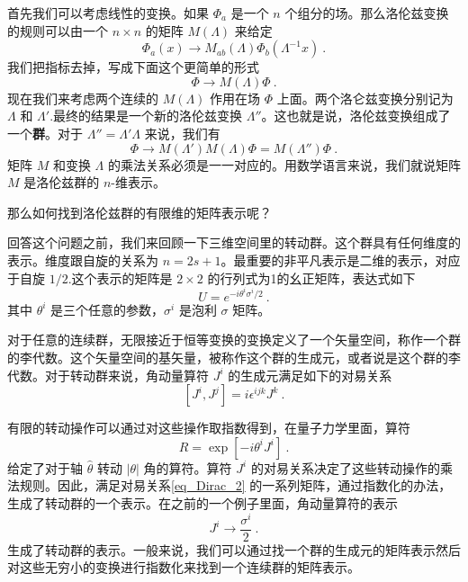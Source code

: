 首先我们可以考虑线性的变换。如果 $\Phi_a$ 是一个 $n$ 个组分的场。那么洛伦兹变换的规则可以由一个 $n\times n$ 的矩阵 $M(\Lambda)$ 来给定
\begin{equation}
\Phi_a (x) \rightarrow M_{ab} (\Lambda) \Phi_b(\Lambda^{-1} x)~.
\end{equation}
我们把指标去掉，写成下面这个更简单的形式
\begin{equation}
\Phi\rightarrow M(\Lambda)\Phi~.
\end{equation}
现在我们来考虑两个连续的 $M(\Lambda)$ 作用在场 $\Phi$ 上面。两个洛仑兹变换分别记为 $\Lambda$ 和 $\Lambda'$.最终的结果是一个新的洛伦兹变换 $\Lambda''$。这也就是说，洛伦兹变换组成了一个\textbf{群}。对于 $\Lambda''=\Lambda'\Lambda$ 来说，我们有
\begin{equation}
\Phi\rightarrow M(\Lambda')M(\Lambda)\Phi = M(\Lambda'')\Phi~.
\end{equation}
矩阵 $M$ 和变换 $\Lambda$ 的乘法关系必须是一一对应的。用数学语言来说，我们就说矩阵 $M$ 是洛伦兹群的 $n$-维表示。

那么如何找到洛伦兹群的有限维的矩阵表示呢？

回答这个问题之前，我们来回顾一下三维空间里的转动群。这个群具有任何维度的表示。维度跟自旋的关系为 $n=2s+1$。最重要的非平凡表示是二维的表示，对应于自旋 $1/2$.这个表示的矩阵是 $2\times 2$ 的行列式为1的幺正矩阵，表达式如下
\begin{equation}
U = e^{-i\theta^i\sigma^i/2}~.
\end{equation} 
其中 $\theta^i$ 是三个任意的参数，$\sigma^i$ 是泡利 $\sigma$ 矩阵。

对于任意的连续群，无限接近于恒等变换的变换定义了一个矢量空间，称作一个群的李代数。这个矢量空间的基矢量，被称作这个群的生成元，或者说是这个群的李代数。对于转动群来说，角动量算符 $J^i$ 的生成元满足如下的对易关系
\begin{equation}\label{eq_Dirac_2}
[J^i,J^j] = i \epsilon^{ijk} J^k ~.
\end{equation}

有限的转动操作可以通过对这些操作取指数得到，在量子力学里面，算符
\begin{equation}
R = \exp [-i \theta^i J^i]~.
\end{equation}
给定了对于轴 $\hat\theta$ 转动 $|\theta|$ 角的算符。算符 $J^i$ 的对易关系决定了这些转动操作的乘法规则。因此，满足对易关系\autoref{eq_Dirac_2} 的一系列矩阵，通过指数化的办法，生成了转动群的一个表示。在之前的一个例子里面，角动量算符的表示
\begin{equation}
J^i \rightarrow \frac{\sigma^i}{2}~.
\end{equation}
生成了转动群的表示。一般来说，我们可以通过找一个群的生成元的矩阵表示然后对这些无穷小的变换进行指数化来找到一个连续群的矩阵表示。

